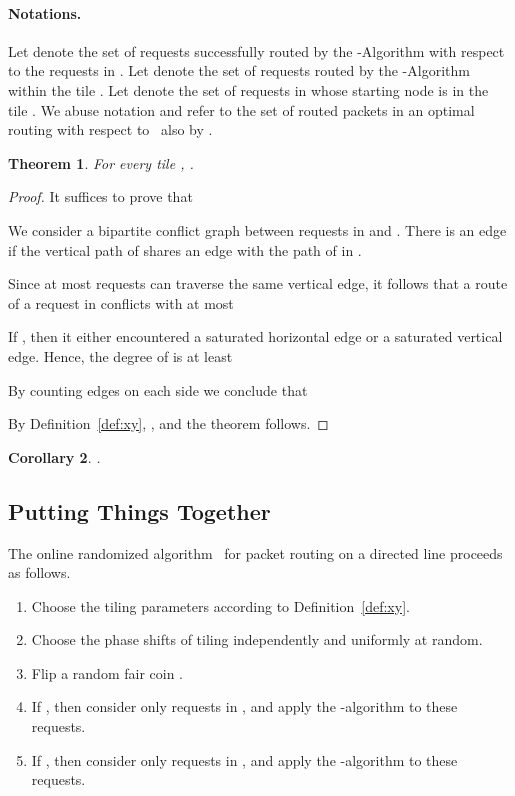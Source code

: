 \documentclass[11pt]{article}
\newtheorem{theorem}{Theorem}
\newtheorem{coro}[theorem]{Corollary}
\newcommand{\alg}{\text{\sc{alg}}}
\newenvironment{proof sketch}[1]{\noindent {\emph{Proof sketch of #1:}}}{\hfill \qed}
\newcommand{\near}{\text{\emph{Near}}}
\begin{document}
\paragraph{Notations.}
Let  denote the set of requests successfully routed by the \near-Algorithm
with respect to the requests in .  Let  denote the set of requests
routed by the \near-Algorithm within the tile . Let  denote the set of
requests in  whose starting node is in the tile . We abuse notation and
refer to the set of routed packets in an optimal routing with respect to \
also by .

\begin{theorem} \label{thm:near}
For every tile ,
  .
\end{theorem}



\begin{proof}
    It suffices to prove that

We consider a bipartite conflict graph between requests in 
and . There is an edge  if
the vertical path of  shares an edge with the path of  in .

Since at most  requests  can traverse the same vertical
edge, it follows that a route of a request in 
conflicts with at most


If , then it either encountered a saturated
horizontal edge or a saturated vertical edge. Hence, the degree of
 is at least

By counting edges on each side we conclude that

By Definition~\ref{def:xy}, , and
the theorem follows.
\end{proof}


\begin{coro}\label{coro:near}
.
\end{coro}
\subsection{Putting Things Together}\label{sec:together}
The online randomized algorithm \alg\ for packet routing on a directed
line proceeds as follows.
\begin{enumerate}
\item Choose the tiling parameters  according to Definition~\ref{def:xy}.
\item Choose the phase shifts  of
  tiling independently and uniformly at random.
\item Flip a random fair coin .
\item If , then consider only requests in , and apply the
  -algorithm to these requests.
\item If , then consider only requests in , and apply the
  -algorithm to these requests.
\end{enumerate}
\end{document}
